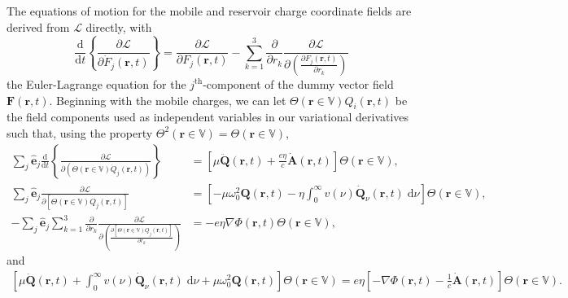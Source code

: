 \documentclass{article}
\begin{document}
The equations of motion for the mobile and reservoir charge coordinate fields are derived from $\mathcal{L}$ directly, with
\begin{equation}
\frac{\mathrm{d}}{\mathrm{d}t}\left\{\frac{\partial \mathcal{L}}{\partial \dot{F}_j(\mathbf{r},t)}\right\} = \frac{\partial \mathcal{L}}{\partial F_j(\mathbf{r},t)} - \sum_{k = 1}^3\frac{\partial}{\partial r_k}\frac{\partial \mathcal{L}}{\partial\!\left(\frac{\partial F_j(\mathbf{r},t)}{\partial r_k}\right)}
\end{equation}
the Euler-Lagrange equation for the $j^\mathrm{th}$-component of the dummy vector field $\mathbf{F}(\mathbf{r},t)$. Beginning with the mobile charges, we can let $\Theta(\mathbf{r}\in\mathbb{V})Q_i(\mathbf{r},t)$ be the field components used as independent variables in our variational derivatives such that, using the property $\Theta^2(\mathbf{r}\in\mathbb{V}) = \Theta(\mathbf{r}\in\mathbb{V})$,
\begin{equation}
\begin{split}
\sum_j\hat{\mathbf{e}}_j\frac{\mathrm{d}}{\mathrm{d}t}\left\{\frac{\partial \mathcal{L}}{\partial\left(\Theta(\mathbf{r}\in\mathbb{V})\dot{Q}_{j}(\mathbf{r},t)\right)}\right\} &= \left[\mu\ddot{\mathbf{Q}}(\mathbf{r},t) + \frac{e\eta}{c}\dot{\mathbf{A}}(\mathbf{r},t)\right]\Theta(\mathbf{r}\in\mathbb{V}),\\
\sum_j\hat{\mathbf{e}}_j\frac{\partial \mathcal{L}}{\partial \left[\Theta(\mathbf{r}\in\mathbb{V})Q_{j}(\mathbf{r},t)\right]} &= \left[-\mu\omega_0^2\mathbf{Q}(\mathbf{r},t)
- \eta\int_0^\infty v(\nu)\dot{\mathbf{Q}}_\nu(\mathbf{r},t)\;\mathrm{d}\nu\right]\Theta(\mathbf{r}\in\mathbb{V}),\\
-\sum_j\hat{\mathbf{e}}_j\sum_{k = 1}^3\frac{\partial}{\partial r_k}\frac{\partial \mathcal{L}}{\partial\!\left(\frac{\partial \left[\Theta(\mathbf{r}\in\mathbb{V})Q_{j}(\mathbf{r},t)\right]}{\partial r_k}\right)} &= -e\eta\nabla\Phi(\mathbf{r},t)\Theta(\mathbf{r}\in\mathbb{V}),
\end{split}
\end{equation}
and
\begin{equation}\label{eq:eqOfMotionQm}
\begin{split}
\left[\mu\ddot{\mathbf{Q}}(\mathbf{r},t) + \int_0^\infty v(\nu)\dot{\mathbf{Q}}_\nu(\mathbf{r},t)\;\mathrm{d}\nu + \mu\omega_0^2\mathbf{Q}(\mathbf{r},t)\right]\Theta(\mathbf{r}\in\mathbb{V}) = e\eta\left[-\nabla\Phi(\mathbf{r},t) - \frac{1}{c}\dot{\mathbf{A}}(\mathbf{r},t)\right]\Theta(\mathbf{r}\in\mathbb{V}).
\end{split}
\end{equation}
\end{document}
